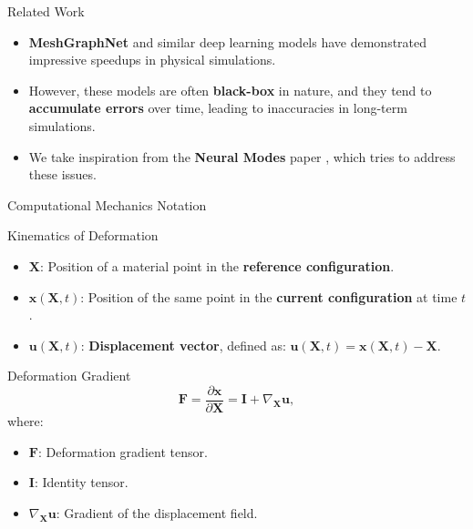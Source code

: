 \documentclass[9pt]{beamer}
\begin{document}
\begin{frame}{Related Work}
    \begin{itemize}
        \item \textbf{MeshGraphNet} \cite{pfaffLearningMeshBasedSimulation2021a} and similar deep learning models have demonstrated impressive speedups in physical simulations.
        \item However, these models are often \textbf{black-box} in nature, and they tend to \textbf{accumulate errors} over time, leading to inaccuracies in long-term simulations.
        \item  We take inspiration from the \textbf{Neural Modes} paper \cite{Wang_Du_Coros_Thomaszewski_2024}, which tries to address these issues.
    \end{itemize}
\end{frame}


\begin{frame}{Computational Mechanics Notation}
    \begin{block}{Kinematics of Deformation}
        \begin{itemize}
            \item \(\bm{X}\): Position of a material point in the \textbf{reference configuration}.
            \item \(\bm{x}(\bm{X}, t)\): Position of the same point in the \textbf{current configuration} at time \(t\).
            \item \(\bm{u}(\bm{X}, t)\): \textbf{Displacement vector}, defined as:
            \(
                \bm{u}(\bm{X}, t) = \bm{x}(\bm{X}, t) - \bm{X}.
            \)
        \end{itemize}
    \end{block}
    
    \begin{block}{Deformation Gradient}
        \[
            \bm{F} = \frac{\partial \bm{x}}{\partial \bm{X}} = \bm{I} + \nabla_{\bm{X}} \bm{u},
        \]
        where:
        \begin{itemize}
            \item \(\bm{F}\): Deformation gradient tensor.
            \item \(\bm{I}\): Identity tensor.
            \item \(\nabla_{\bm{X}} \bm{u}\): Gradient of the displacement field.
        \end{itemize}
    \end{block}
\end{frame}
\end{document}
